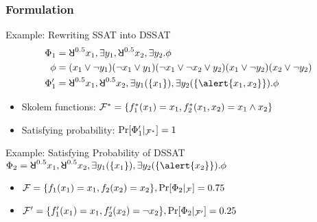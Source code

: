 \begin{frame}
  \frametitle{Formulation}
  \begin{block}{Example: Rewriting SSAT into DSSAT}
    \abovedisplayskip=0pt
    \belowdisplayskip=0pt
    \begin{align*}
      \Qf_1  & = \random{0.5} x_1, \exists y_1, \random{0.5} x_2, \exists y_2. \pf                              \\
      \pf    & = (x_1 \lor \lnot y_1)
      (\lnot x_1 \lor y_1)
      (\lnot x_1 \lor \lnot x_2 \lor y_2)
      (x_1 \lor \lnot y_2)
      (x_2 \lor \lnot y_2)                                                                                      \\
      \Qf_1' & = \random{0.5} x_1, \random{0.5} x_2, \exists y_1(\{x_1\}), \exists y_2(\{\alert{x_1,x_2}\}).\pf
    \end{align*}
    \begin{itemize}
      \item Skolem functions: $\mathcal{F}^*=\{f^*_1(x_1)=x_1,f^*_2(x_1,x_2)=x_1 \land x_2\}$
      \item Satisfying probability: $\Pr[\Phi_1'|_{\mathcal{F}^*}]=1$
    \end{itemize}
  \end{block}
  \pause
  \begin{block}{Example: Satisfying Probability of DSSAT}
    \abovedisplayskip=0pt
    $\Qf_2 = \random{0.5} x_1, \random{0.5} x_2, \exists y_1(\{x_1\}), \exists y_2(\{\alert{x_2}\}).\pf$
    \begin{itemize}
      \item $\mathcal{F}=\{f_1(x_1)=x_1,f_2(x_2)=x_2\},\Pr[\Phi_2|_{\mathcal{F}}]=0.75$
      \item $\mathcal{F}'=\{f_1'(x_1)=x_1,f_2'(x_2)=\neg x_2\},\Pr[\Phi_2|_{\mathcal{F}'}]=0.25$
    \end{itemize}
  \end{block}
\end{frame}